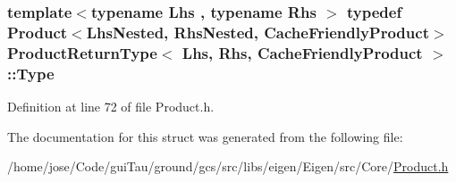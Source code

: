 \hypertarget{struct_product_return_type_3_01_lhs_00_01_rhs_00_01_cache_friendly_product_01_4_a87d5a238bf1b48cd90967a036b0bf61d}{
\subsubsection[{Type}]{\setlength{\rightskip}{0pt plus 5cm}template$<$typename Lhs , typename Rhs $>$ typedef {\bf Product}$<${\bf Lhs\-Nested}, {\bf Rhs\-Nested}, {\bf Cache\-Friendly\-Product}$>$ {\bf Product\-Return\-Type}$<$ Lhs, Rhs, {\bf Cache\-Friendly\-Product} $>$\-::{\bf Type}}}\label{struct_product_return_type_3_01_lhs_00_01_rhs_00_01_cache_friendly_product_01_4_a87d5a238bf1b48cd90967a036b0bf61d}


Definition at line 72 of file Product.\-h.



The documentation for this struct was generated from the following file\-:\begin{DoxyCompactItemize}
\item 
/home/jose/\-Code/gui\-Tau/ground/gcs/src/libs/eigen/\-Eigen/src/\-Core/\hyperlink{_product_8h}{Product.\-h}\end{DoxyCompactItemize}
